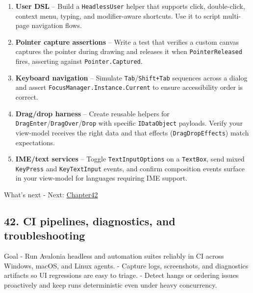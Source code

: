 \begin{enumerate}
\def\labelenumi{\arabic{enumi}.}
\tightlist
\item
  \textbf{User DSL} -- Build a \passthrough{\lstinline!HeadlessUser!}
  helper that supports click, double-click, context menu, typing, and
  modifier-aware shortcuts. Use it to script multi-page navigation
  flows.
\item
  \textbf{Pointer capture assertions} -- Write a test that verifies a
  custom canvas captures the pointer during drawing and releases it when
  \passthrough{\lstinline!PointerReleased!} fires, asserting against
  \passthrough{\lstinline!Pointer.Captured!}.
\item
  \textbf{Keyboard navigation} -- Simulate
  \passthrough{\lstinline!Tab!}/\passthrough{\lstinline!Shift+Tab!}
  sequences across a dialog and assert
  \passthrough{\lstinline!FocusManager.Instance.Current!} to ensure
  accessibility order is correct.
\item
  \textbf{Drag/drop harness} -- Create reusable helpers for
  \passthrough{\lstinline!DragEnter!}/\passthrough{\lstinline!DragOver!}/\passthrough{\lstinline!Drop!}
  with specific \passthrough{\lstinline!IDataObject!} payloads. Verify
  your view-model receives the right data and that effects
  (\passthrough{\lstinline!DragDropEffects!}) match expectations.
\item
  \textbf{IME/text services} -- Toggle
  \passthrough{\lstinline!TextInputOptions!} on a
  \passthrough{\lstinline!TextBox!}, send mixed
  \passthrough{\lstinline!KeyPress!} and
  \passthrough{\lstinline!KeyTextInput!} events, and confirm composition
  events surface in your view-model for languages requiring IME support.
\end{enumerate}

What's next - Next: \href{Chapter42.md}{Chapter42}

\newpage

\subsection{42. CI pipelines, diagnostics, and
troubleshooting}\label{ci-pipelines-diagnostics-and-troubleshooting}

Goal - Run Avalonia headless and automation suites reliably in CI across
Windows, macOS, and Linux agents. - Capture logs, screenshots, and
diagnostics artifacts so UI regressions are easy to triage. - Detect
hangs or ordering issues proactively and keep runs deterministic even
under heavy concurrency.


